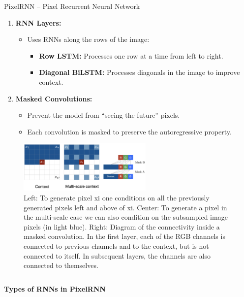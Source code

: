 \begin{frame}[allowframebreaks]{PixelRNN – Pixel Recurrent Neural Network}
\begin{enumerate}
        \item \textbf{RNN Layers:}
        \begin{itemize}
            \item Uses RNNs along the rows of the image:
            \begin{itemize}
                \item \textbf{Row LSTM:} Processes one row at a time from left to right.
                \item \textbf{Diagonal BiLSTM:} Processes diagonals in the image to improve context.
            \end{itemize}
        \end{itemize}

        \item \textbf{Masked Convolutions:}
        \begin{itemize}
            \item Prevent the model from “seeing the future” pixels.
            \item Each convolution is masked to preserve the autoregressive property.
        \end{itemize}
    \end{enumerate}

    \framebreak
    \begin{figure}
        \centering
        \includegraphics[height=1.0in]{images/arm/pixel-rnn.png}
        \caption{Left: To generate pixel xi one conditions on all the previously generated pixels left and above of xi. Center: To generate a pixel in the multi-scale case we can also condition on the
subsampled image pixels (in light blue). Right: Diagram of the
connectivity inside a masked convolution. In the first layer, each
of the RGB channels is connected to previous channels and to the
context, but is not connected to itself. In subsequent layers, the
channels are also connected to themselves.}
    \end{figure}

    \framebreak

    \begin{columns}
        \begin{column}{0.4\textwidth}
            \textbf{Types of RNNs in PixelRNN}


\end{column}
\end{columns}
\end{frame}
